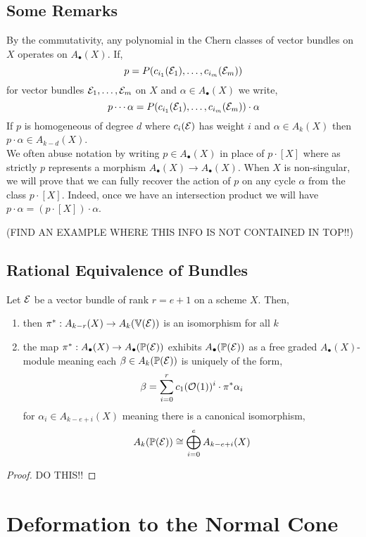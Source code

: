 \documentclass[12pt]{article}
\begin{document}
\subsection{Some Remarks}

By the commutativity, any polynomial in the Chern classes of vector bundles on $X$ operates on $A_\bullet(X)$. If,
\[ p = P(c_{i_1}(\mathcal{E}_1), \dots, c_{i_m}(\mathcal{E}_m)) \]
for vector bundles $\mathcal{E}_1, \dots, \mathcal{E}_m$ on $X$ and $\alpha \in A_\bullet(X)$ we write,
\[ p \cdots \alpha = P(c_{i_1}(\mathcal{E}_1), \dots, c_{i_m}(\mathcal{E}_m)) \cdot \alpha \]
If $p$ is homogeneous of degree $d$ where $c_i(\mathcal{E})$ has weight $i$ and $\alpha \in A_k(X)$ then $p \cdot \alpha \in A_{k-d}(X)$.
\bigskip\\
We often abuse notation by writing $p \in A_\bullet(X)$ in place of $p \cdot [X]$ where as strictly $p$ represents a morphism $A_\bullet(X) \to A_\bullet(X)$. When $X$ is non-singular, we will prove that we can fully recover the action of $p$ on any cycle $\alpha$ from the class $p \cdot [X]$. Indeed, once we have an intersection product we will have $p \cdot \alpha = (p \cdot [X]) \cdot \alpha$. 

(FIND AN EXAMPLE WHERE THIS INFO IS NOT CONTAINED IN TOP!!)

\subsection{Rational Equivalence of Bundles}

\begin{theorem}
Let $\mathcal{E}$ be a vector bundle of rank $r = e + 1$ on a scheme $X$. Then,
\begin{enumerate}
\item then $\pi^* : A_{k-r}(X) \to A_k(\mathbb{V}(\mathcal{E}))$ is an isomorphism for all $k$

\item the map $\pi^* : A_\bullet(X) \to A_\bullet(\mathbb{P}(\mathcal{E}))$ exhibits $A_\bullet(\mathbb{P}(\mathcal{E}))$ as a free graded $A_\bullet(X)$-module meaning each $\beta \in A_k(\mathbb{P}(\mathcal{E}))$ is uniquely of the form,
\[ \beta = \sum_{i = 0}^r c_1(\mathcal{O}_{}(1))^i \cdot \pi^* \alpha_i \]
for $\alpha_i \in A_{k - e + i}(X)$ meaning there is a canonical isomorphism,
\[ A_k(\mathbb{P}(\mathcal{E})) \cong \bigoplus_{i = 0}^e A_{k-e+i}(X) \]
\end{enumerate}
\end{theorem}

\begin{proof}
DO THIS!!
\end{proof}

\section{Deformation to the Normal Cone}
\end{document}

